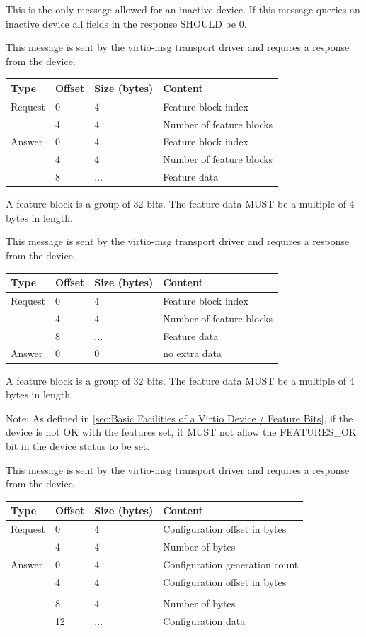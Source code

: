 This is the only message allowed for an inactive device. If this message queries
an inactive device all fields in the response SHOULD be 0.


This message is sent by the virtio-msg transport driver and requires a
response from the device.

\begin{tabular}{|l|l|l|l|}
\hline
Type & Offset & Size (bytes) & Content \\
\hline \hline
Request & 0 & 4 & Feature block index \\
& 4 & 4 & Number of feature blocks \\
\hline
Answer & 0 & 4 & Feature block index \\
& 4 & 4 & Number of feature blocks \\
& 8 & ... & Feature data \\
\hline
\end{tabular}

A feature block is a group of 32 bits.  The feature data MUST be a
multiple of 4 bytes in length.


This message is sent by the virtio-msg transport driver and requires a
response from the device.

\begin{tabular}{|l|l|l|l|}
\hline
Type & Offset & Size (bytes) & Content \\
\hline \hline
Request & 0 & 4 & Feature block index \\
& 4 & 4 & Number of feature blocks \\
& 8 & ... & Feature data \\
\hline
Answer & 0 & 0 & no extra data \\
\hline
\end{tabular}

A feature block is a group of 32 bits.  The feature data MUST be a
multiple of 4 bytes in length.

Note: As defined in \ref{sec:Basic Facilities of a Virtio Device / Feature Bits},
if the device is not OK with the features set, it MUST not allow
the FEATURES_OK bit in the device status to be set.


This message is sent by the virtio-msg transport driver and requires a
response from the device.

\begin{tabular}{|l|l|l|l|}
\hline
Type & Offset & Size (bytes) & Content \\
\hline \hline
Request & 0 & 4 & Configuration offset in bytes \\
& 4 & 4 & Number of bytes \\
\hline
Answer & 0 & 4 & Configuration generation count \\
& 4 & 4 & Configuration offset in bytes \\  \\
& 8 & 4 & Number of bytes \\
& 12 & ... & Configuration data \\
\hline
\end{tabular}

